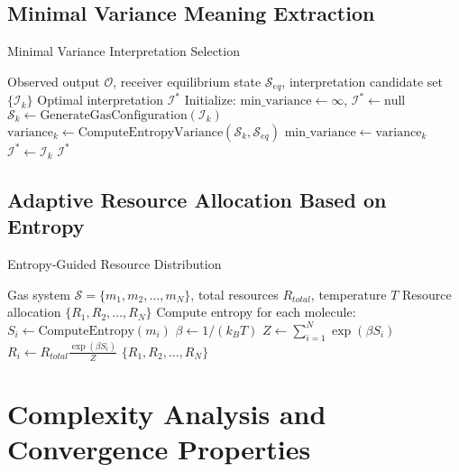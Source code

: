 \documentclass[11pt,a4paper]{article}
\begin{document}
\subsection{Minimal Variance Meaning Extraction}

\begin{algorithm}
\caption{Minimal Variance Interpretation Selection}
\begin{algorithmic}[1]
\REQUIRE Observed output $\mathcal{O}$, receiver equilibrium state $\mathcal{S}_{eq}$, interpretation candidate set $\{\mathcal{I}_k\}$
\ENSURE Optimal interpretation $\mathcal{I}^*$
\STATE Initialize: $\text{min\_variance} \leftarrow \infty$, $\mathcal{I}^* \leftarrow \text{null}$
    \STATE $\mathcal{S}_k \leftarrow \text{GenerateGasConfiguration}(\mathcal{I}_k)$
    \STATE $\text{variance}_k \leftarrow \text{ComputeEntropyVariance}(\mathcal{S}_k, \mathcal{S}_{eq})$
        \STATE $\text{min\_variance} \leftarrow \text{variance}_k$
        \STATE $\mathcal{I}^* \leftarrow \mathcal{I}_k$
    \ENDIF
\ENDFOR
\RETURN $\mathcal{I}^*$
\end{algorithmic}
\end{algorithm}

\subsection{Adaptive Resource Allocation Based on Entropy}

\begin{algorithm}
\caption{Entropy-Guided Resource Distribution}
\begin{algorithmic}[1]
\REQUIRE Gas system $\mathcal{S} = \{m_1, m_2, \ldots, m_N\}$, total resources $R_{total}$, temperature $T$
\ENSURE Resource allocation $\{R_1, R_2, \ldots, R_N\}$
\STATE Compute entropy for each molecule: $S_i \leftarrow \text{ComputeEntropy}(m_i)$
\STATE $\beta \leftarrow 1/(k_B T)$
\STATE $Z \leftarrow \sum_{i=1}^{N} \exp(\beta S_i)$ 
    \STATE $R_i \leftarrow R_{total} \frac{\exp(\beta S_i)}{Z}$
\ENDFOR
\RETURN $\{R_1, R_2, \ldots, R_N\}$
\end{algorithmic}
\end{algorithm}

\section{Complexity Analysis and Convergence Properties}
\end{document}
